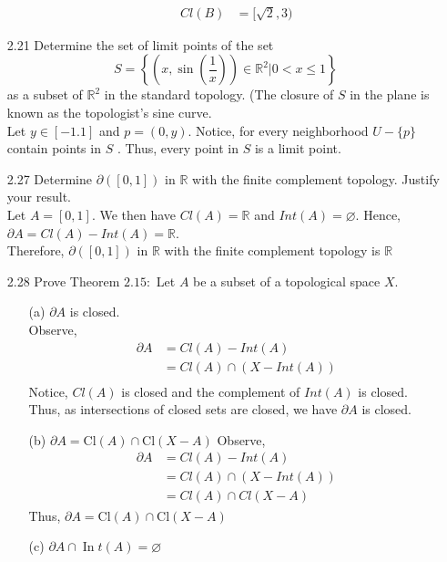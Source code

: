 \documentclass[12pt]{article}
\newcommand{\R}{\mathds{R}}
\begin{document}
\begin{enumerate}
\begin{enumerate}
\begin{align*}
			Cl(B) &= [\sqrt{2},3)
			\end{align*}
		\end{enumerate}
	\item[2.21] Determine the set of limit points of the set
		\[S = \left\{ \left( x , \sin \left( \frac { 1 } { x } \right) \right) \in \mathbb { R } ^ { 2 } | 0 < x \leq 1 \right\}\]
		as a subset of $\mathbb { R } ^ { 2 }$ in the standard topology. (The closure of $S$ in the plane is known as the topologist's sine curve.\\
		Let $ y\in[-1.1] $ and $ p  = (0,y)$. Notice, for every neighborhood $ U - \{p\}$ contain points in $ S $ . Thus, every point in $ S $ is a limit point.
	\item[2.27] Determine $\partial ( [ 0,1 ] )$ in $\mathbb { R }$ with the finite complement topology. Justify your result.\\
	Let $ A = [0,1] $. We then have $ Cl(A) = \R $ and $ Int(A)=\varnothing $. Hence, $ \partial A = Cl(A)-Int(A)=\R $.\\
	Therefore,  $\partial ( [ 0,1 ] )$ in $\mathbb { R }$ with the finite complement topology is $ \R $
	\item[2.28] Prove Theorem $2.15 :$ Let $A$ be a subset of a topological space $X .$
		\begin{enumerate}
			\item[(a)] $\partial A$ is closed.\\
			Observe, \begin{align*}
		\partial A &= Cl(A) - Int(A) \\
				   &= Cl(A)\cap(X-Int(A))\\
			\end{align*}
			Notice, $ Cl(A) $ is closed and the complement of $ Int(A) $ is closed. \\
			Thus, as intersections of closed sets are closed, we have $ \partial A $ is closed.
			\item[(b)] $\partial A = \mathrm { Cl } ( A ) \cap \mathrm { Cl } ( X - A )$
			Observe,
			 \begin{align*}
			 \partial A &= Cl(A)- Int(A)\\
			 			&= Cl(A) \cap( X - Int(A)) \\
			 			&= Cl(A)\cap Cl(X-A)
			\end{align*}
			Thus,  $\partial A = \mathrm { Cl } ( A ) \cap \mathrm { Cl } ( X - A )$
			\item[(c)] $\partial A \cap \operatorname { In } t ( A ) = \varnothing$\\

\end{enumerate}
\end{enumerate}
\end{document}

